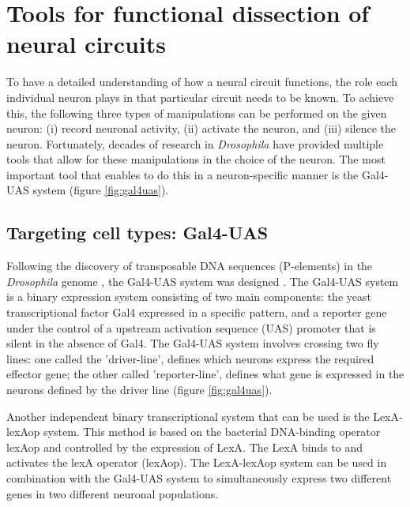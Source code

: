 \section{Tools for functional dissection of \protect{} neural circuits}
To have a detailed understanding of how a neural circuit functions, the role each individual neuron plays in that particular circuit needs to be known. To achieve this, the following three types of manipulations can be performed on the given neuron: (i) record neuronal activity, (ii) activate the neuron, and (iii) silence the neuron. Fortunately, decades of research in \textit{Drosophila} have provided multiple tools that allow for these manipulations in the choice of the neuron. The most important tool that enables to do this in a neuron-specific manner is the Gal4-UAS system (figure \ref{fig:gal4uas}). 

\subsection{Targeting cell types: Gal4-UAS}
Following the discovery of transposable DNA sequences (P-elements) in the \textit{Drosophila} genome \parencite{Rubin1982}, the Gal4-UAS system was designed \parencite{Brand1993}. The Gal4-UAS system is a binary expression system consisting of two main components: the yeast transcriptional factor Gal4 expressed in a specific pattern, and a reporter gene under the control of a upstream activation sequence (UAS) promoter that is silent in the absence of Gal4. The Gal4-UAS system involves crossing two fly lines: one called the 'driver-line', defines which neurons express the required effector gene; the other called 'reporter-line', defines what gene is expressed in the neurons defined by the driver line (figure \ref{fig:gal4uas}). 

Another independent binary transcriptional system that can be used is the LexA-lexAop system. This method is based on the bacterial DNA-binding operator lexAop and controlled by the expression of LexA. The LexA binds to and activates the lexA operator (lexAop). The LexA-lexAop system can be used in combination with the Gal4-UAS system to simultaneously express two different genes in two different neuronal populations. %

